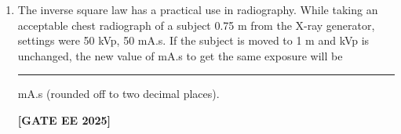 \documentclass[journal]{IEEEtran}
\newcommand{\qfooter}{%
  \begin{flushright}\footnotesize\textbf{[GATE EE 2025]}\end{flushright}\vspace{1em}%
}
\begin{document}
\begin{enumerate}
\qfooter

\item The inverse square law has a practical use in radiography.
While taking an acceptable chest radiograph of a subject 0.75 m from the X-ray generator, settings were 50 kVp, 50 mA.s.
If the subject is moved to 1 m and kVp is unchanged, the new value of mA.s to get the same exposure will be \rule{2cm}{0.15mm} mA.s (rounded off to two decimal places).

\qfooter

\end{enumerate}
\end{document}
